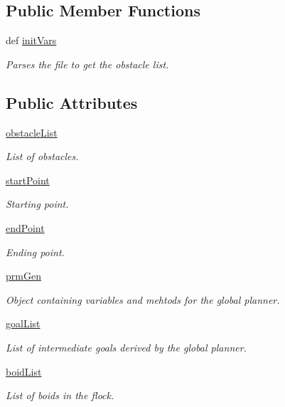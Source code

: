 \subsection*{Public Member Functions}
\begin{DoxyCompactItemize}
\item 
def \hyperlink{classconfiguration_1_1PolyFileConfiguration_ad68553a7fd263204c69800782fdd03a8}{init\-Vars}
\begin{DoxyCompactList}\small\item\em Parses the file to get the obstacle list. \end{DoxyCompactList}\end{DoxyCompactItemize}
\subsection*{Public Attributes}
\begin{DoxyCompactItemize}
\item 
\hyperlink{classconfiguration_1_1PolyFileConfiguration_a4ea5eea95680f3bfdad4adce0578a0f0}{obstacle\-List}
\begin{DoxyCompactList}\small\item\em List of obstacles. \end{DoxyCompactList}\item 
\hyperlink{classconfiguration_1_1PolyFileConfiguration_ae5c780baacd4b800d1646a29a8608cbf}{start\-Point}
\begin{DoxyCompactList}\small\item\em Starting point. \end{DoxyCompactList}\item 
\hyperlink{classconfiguration_1_1PolyFileConfiguration_acb9da93ddecef1bb34bbce601473f0f1}{end\-Point}
\begin{DoxyCompactList}\small\item\em Ending point. \end{DoxyCompactList}\item 
\hyperlink{classconfiguration_1_1PolyFileConfiguration_a075aa5177145a1041468f24e4829e8e8}{prm\-Gen}
\begin{DoxyCompactList}\small\item\em Object containing variables and mehtods for the global planner. \end{DoxyCompactList}\item 
\hyperlink{classconfiguration_1_1PolyFileConfiguration_a2fd4dfe65bb97105e3ff146d125849df}{goal\-List}
\begin{DoxyCompactList}\small\item\em List of intermediate goals derived by the global planner. \end{DoxyCompactList}\item 
\hyperlink{classconfiguration_1_1PolyFileConfiguration_a34104bbe3eb34147465a4d9e05d6c6b6}{boid\-List}
\begin{DoxyCompactList}\small\item\em List of boids in the flock. \end{DoxyCompactList}\end{DoxyCompactItemize}

